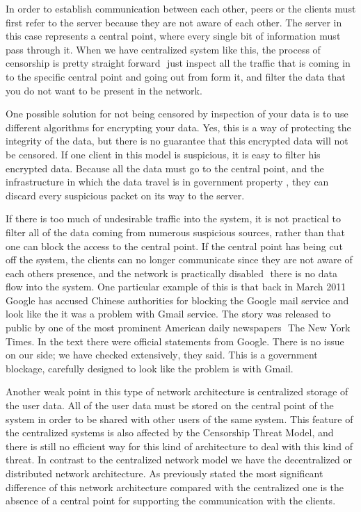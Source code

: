 In order to establish communication between each other, peers or the clients must first refer to the server because they are not aware of each other. The server in this case represents a central point, where every single bit of information must pass through it. When we have centralized system like this, the process of censorship is pretty straight forward  just inspect all the traffic that is coming in to the specific central point and going out from form it, and filter the data that you do not want to be present in the network. 

One possible solution for not being censored by inspection of your data is to use different algorithms for encrypting your data. Yes, this is a way of protecting the integrity of the data, but there is no guarantee that this encrypted data will not be censored. If one client in this model is suspicious, it is easy to filter his encrypted data. Because all the data must go to the central point, and the infrastructure in which the data travel is in government property \cite{dianotti2011}, they can discard every suspicious packet on its way to the server.

If there is too much of undesirable traffic into the system, it is not practical to filter all of the data coming from numerous suspicious sources, rather than that one can block the access to the central point. If the central point has being cut off the system, the clients can no longer communicate since they are not aware of each others presence, and the network is practically disabled  there is no data flow into the system. One particular example of this is that back in March 2011 Google has accused Chinese authorities for blocking the Google mail service and look like the it was a problem with Gmail service. The story was released to public by one of the most prominent American daily newspapers  The New York Times. In the text there were official statements from Google. There is no issue on our side; we have checked extensively, they said. This is a government blockage, carefully designed to look like the problem is with Gmail. \cite{web:newyorktimes}

Another weak point in this type of network architecture is centralized storage of the user data. All of the user data must be stored on the central point of the system in order to be shared with other users of the same system. This feature of the centralized systems is also affected by the Censorship Threat Model, and there is still no efficient way for this kind of architecture to deal with this kind of threat.
In contrast to the centralized network model we have the decentralized or distributed network architecture. As previously stated the most significant difference of this network architecture compared with the centralized one is the absence of a central point for supporting the communication with the clients. 

